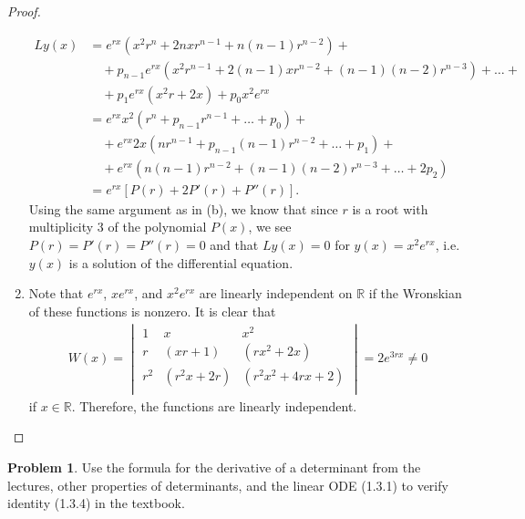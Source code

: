 \documentclass[12pt]{article}
\theoremstyle{definition}
\newtheorem{problem}{Problem}
\begin{document}
\begin{proof}
\begin{enumerate}
\begin{align*}
        Ly(x) &= e^{rx}\left(x^2r^n + 2nxr^{n-1} + n(n-1)r^{n-2}\right) +\\
        &\quad+ p_{n-1}e^{rx}\left(x^2r^{n-1} + 2(n-1)xr^{n-2} + (n-1)(n-2)r^{n-3}\right) + \dots +\\
        &\quad+ p_1 e^{rx}(x^2r+2x) + p_0 x^2e^{rx} \\
        &= e^{rx}x^2(r^n + p_{n-1}r^{n-1} +\dots + p_0) + \\
        &\quad + e^{rx}2x(nr^{n-1} + p_{n-1}(n-1)r^{n-2} + \dots + p_1) + \\
        &\quad + e^{rx}(n(n-1)r^{n-2} + (n-1)(n-2)r^{n-3} + \dots + 2p_2) \\
        &= e^{rx}\left[P(r) + 2P'(r) + P''(r)\right].
      \end{align*}
      Using the same argument as in (b), we know that
      since $r$ is a root with multiplicity 3 of the polynomial $P(x)$, we
      see $P(r) = P'(r) = P''(r) = 0$ and that $Ly(x) = 0$ for $y(x) = x^2e^{rx}$, i.e.\
      $y(x)$ is a solution of the differential equation.
    \item Note that $e^{rx}$, $xe^{rx}$, and $x^2 e^{rx}$
      are linearly independent on $\mathbb{R}$ if the Wronskian of these functions is nonzero. It is clear that
      \begin{align*}
        W(x) =
        \begin{vmatrix}
          1 & x & x^2  \\
          r & (xr + 1) &  (rx^2 + 2x) \\
          r^2 & (r^2x + 2r) & (r^2x^2 + 4rx + 2)  \\
        \end{vmatrix} = 2e^{3rx} \neq 0
      \end{align*}
      if $x \in \mathbb{R}$. Therefore, the functions are linearly independent.
  \end{enumerate}
\end{proof}
\newpage


\begin{problem}
  Use the formula for the derivative of a determinant from the lectures, other
  properties of determinants, and the linear ODE (1.3.1) to verify identity
  (1.3.4) in the textbook.
\end{problem}
\end{document}
